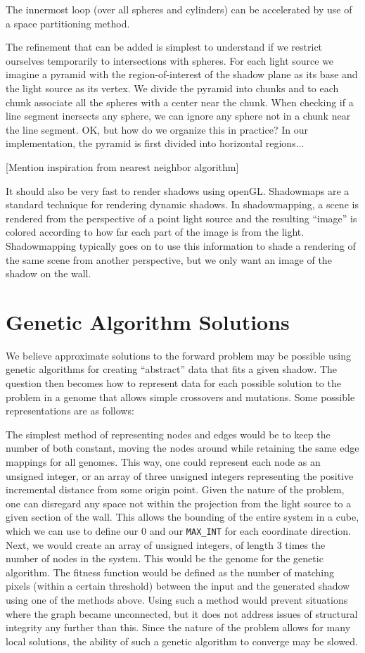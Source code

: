 \documentclass[10pt]{article}
\begin{document}
The innermost loop (over all spheres and cylinders) can be accelerated by use of a space partitioning method.

The refinement that can be added is simplest to understand if we restrict ourselves temporarily to intersections with spheres. For each light source we imagine a pyramid with the region-of-interest of the shadow plane as its base and the light source as its vertex. We divide the pyramid into chunks and to each chunk associate all the spheres with a center near the chunk. When checking if a line segment inersects any sphere, we can ignore any sphere not in a chunk near the line segment. OK, but how do we organize this in practice? In our implementation, the pyramid is first divided into horizontal regions...

[Mention inspiration from nearest neighbor algorithm]


It should also be very fast to render shadows using openGL. Shadowmaps are a standard technique for rendering dynamic shadows. In shadowmapping, a scene is rendered from the perspective of a point light source and the resulting ``image'' is colored according to how far each part of the image is from the light. Shadowmapping typically goes on to use this information to shade a rendering of the same scene from another perspective, but we only want an image of the shadow on the wall.

\section{Genetic Algorithm Solutions}
We believe approximate solutions to the forward problem may be possible using genetic algorithms for creating ``abstract'' data that fits a given shadow.  The question then becomes how to represent data for each possible solution to the problem in a genome that allows simple crossovers and mutations.  Some possible representations are as follows: 

The simplest method of representing nodes and edges would be to keep the number of both constant, moving the nodes around while retaining the same edge mappings for all genomes.  This way, one could represent each node as an unsigned integer, or an array of three unsigned integers representing the positive incremental distance from some origin point.  Given the nature of the problem, one can disregard any space not within the projection from the light source to a given section of the wall.  This allows the bounding of the entire system in a cube, which we can use to define our 0 and our \texttt{MAX\_INT} for each coordinate direction.  Next, we would create an array of unsigned integers, of length 3 times the number of nodes in the system.  This would be the genome for the genetic algorithm.  The fitness function would be defined as the number of matching pixels (within a certain threshold) between the input and the generated shadow using one of the methods above.  Using such a method would prevent situations where the graph became unconnected, but it does not address issues of structural integrity any further than this.  Since the nature of the problem allows for many local solutions, the ability of such a genetic algorithm to converge may be slowed.
\end{document}
